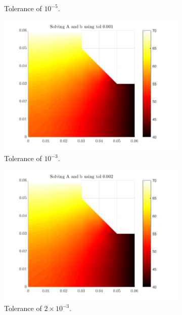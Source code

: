 \documentclass[12pt,a4paper]{article}
\begin{document}
\begin{figure}
\begin{subfigure}[b]{0.4\textwidth}
		\caption{Tolerance of $10^{-5}$.}
		\label{fig:tole-05}
	\end{subfigure}
	\hfill
	\begin{subfigure}[b]{0.4\textwidth}
		\centering
		\includegraphics[width=\linewidth]{images/Comparisontol0-001.png}
		\caption{Tolerance of $10^{-3}$.}
		\label{fig:tol0.001}
	\end{subfigure}
	\hfill
	\begin{subfigure}[b]{0.4\textwidth}
		\centering
		\includegraphics[width=\linewidth]{images/Comparisontol0-002.png}
		\caption{Tolerance of $2 \times 10^{-3}$.}
		\label{fig:tol0.002}
	\end{subfigure}
	\hfill
	\begin{subfigure}[b]{0.4\textwidth}

\end{subfigure}
\end{figure}
\end{document}
